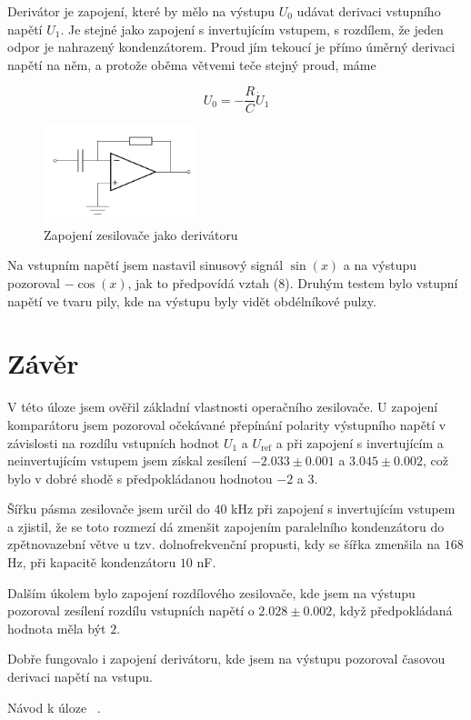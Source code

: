 \documentclass[a4paper,11pt]{article}
\begin{document}
Derivátor je zapojení, které by mělo na výstupu $ U_0 $ udávat derivaci vstupního napětí $ U_1 $. Je stejné jako zapojení s invertujícím vstupem, s rozdílem, že jeden odpor je nahrazený kondenzátorem. Proud jím tekoucí je přímo úměrný derivaci napětí na něm, a protože oběma větvemi teče stejný proud, máme

\begin{equation}
U_0 = - \frac{R}{C} \dot U_1
\end{equation}


\begin{figure}[htpb]
    \centering
    \includegraphics[width=0.4\textwidth]{derivator_sch.jpg}
    \caption{Zapojení zesilovače jako derivátoru}
\end{figure}


Na vstupním napětí jsem nastavil sinusový signál $ \sin(x) $  a na výstupu pozoroval $ - \cos(x) $, jak to předpovídá vztah (8). Druhým testem bylo vstupní napětí ve tvaru pily, kde na výstupu byly vidět obdélníkové pulzy. 

\section{Závěr}

V této úloze jsem ověřil základní vlastnosti operačního zesilovače. U zapojení komparátoru jsem pozoroval očekávané přepínání polarity výstupního napětí v závislosti na rozdílu vstupních hodnot $U_1$ a $U_\text{ref}$ a při zapojení s invertujícím a neinvertujícím vstupem jsem získal zesílení $-2.033 \pm 0.001$ a $ 3.045 \pm 0.002 $, což bylo v dobré shodě s předpokládanou hodnotou $ -2 $ a $ 3 $.

Šířku pásma zesilovače jsem určil do $40 $ kHz při zapojení s invertujícím vstupem a zjistil, že se toto rozmezí dá zmenšit zapojením paralelního kondenzátoru do zpětnovazební větve u tzv. dolnofrekvenční propusti, kdy se šířka zmenšila na $ 168 $  Hz, při kapacitě kondenzátoru $ 10 $ nF.

Dalším úkolem bylo zapojení rozdílového zesilovače, kde jsem na výstupu pozoroval zesílení rozdílu vstupních napětí o $ 2.028 \pm 0.002 $, když předpokládaná hodnota měla být $ 2 $.

Dobře fungovalo i zapojení derivátoru, kde jsem na výstupu pozoroval časovou derivaci napětí na vstupu. 



\begin{thebibliography}{0}
 Návod k úloze ~\url{}.   
\end{thebibliography}
\end{document}
